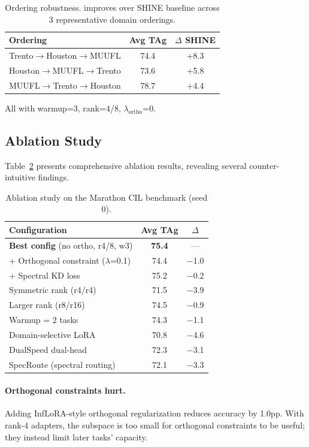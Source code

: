 \begin{table}[t]
\centering
\caption{Ordering robustness. \methodname{} improves over SHINE baseline across 3 representative domain orderings.}
\label{tab:ordering}
\begin{tabular}{lcc}
\toprule
Ordering & Avg TAg & $\Delta$ SHINE \\
\midrule
Trento$\to$Houston$\to$MUUFL & 74.4 & +8.3 \\
Houston$\to$MUUFL$\to$Trento & 73.6 & +5.8 \\
MUUFL$\to$Trento$\to$Houston & 78.7 & +4.4 \\
\bottomrule
\end{tabular}
\vspace{-1mm}
{\footnotesize All with warmup=3, rank=4/8, $\lambda_{\text{ortho}}$=0.}
\end{table}

\subsection{Ablation Study}
\label{sec:ablation}

Table~\ref{tab:ablation} presents comprehensive ablation results, revealing several counter-intuitive findings.

\begin{table}[t]
\centering
\caption{Ablation study on the Marathon CIL benchmark (seed 0).}
\label{tab:ablation}
\begin{tabular}{lcc}
\toprule
Configuration & Avg TAg & $\Delta$ \\
\midrule
\textbf{Best config} (no ortho, r4/8, w3) & \textbf{75.4} & --- \\
+ Orthogonal constraint ($\lambda$=0.1) & 74.4 & $-$1.0 \\
+ Spectral KD loss & 75.2 & $-$0.2 \\
Symmetric rank (r4/r4) & 71.5 & $-$3.9 \\
Larger rank (r8/r16) & 74.5 & $-$0.9 \\
Warmup = 2 tasks & 74.3 & $-$1.1 \\
Domain-selective LoRA & 70.8 & $-$4.6 \\
DualSpeed dual-head & 72.3 & $-$3.1 \\
SpecRoute (spectral routing) & 72.1 & $-$3.3 \\
\bottomrule
\end{tabular}
\end{table}

\paragraph{Orthogonal constraints hurt.}
Adding InfLoRA-style orthogonal regularization reduces accuracy by 1.0pp. With rank-4 adapters, the subspace is too small for orthogonal constraints to be useful; they instead limit later tasks' capacity.

